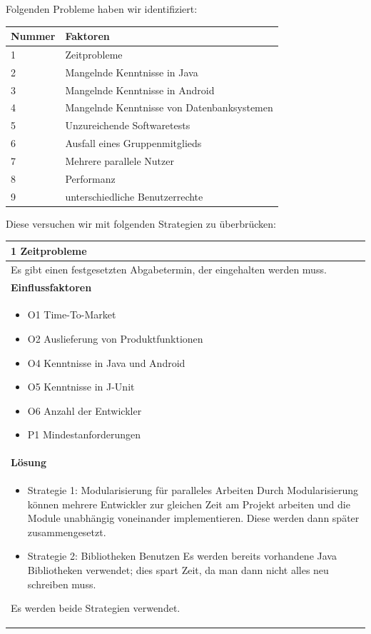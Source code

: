 \documentclass[fontsize=12pt,paper=a4,twoside]{scrartcl}
\begin{document}
Folgenden Probleme haben wir identifiziert:\\

\begin{table}[H]
\centering
\begin{tabular}{|l|l|}\hline
\textbf{Nummer} & \textbf{Faktoren}\\ \hline \hline
1 & Zeitprobleme\\ \hline
2 & Mangelnde Kenntnisse in Java\\ \hline
3 & Mangelnde Kenntnisse in Android\\ \hline
4 & Mangelnde Kenntnisse von Datenbanksystemen\\ \hline
5 & Unzureichende Softwaretests\\ \hline
6 & Ausfall eines Gruppenmitglieds\\ \hline
7 & Mehrere parallele Nutzer\\ \hline
8 & Performanz\\ \hline
9 & unterschiedliche Benutzerrechte\\ \hline
\end{tabular}
\end{table}

Diese versuchen wir mit folgenden Strategien zu überbrücken:

\begin{table}[H]
\begin{tabular}{|p{\textwidth}|}\hline
1 Zeitprobleme\\ \hline
Es gibt einen festgesetzten Abgabetermin, der eingehalten werden muss.\\ \hline
\textbf{Einflussfaktoren}\\
\begin{itemize}
\item O1 Time-To-Market
\item O2 Auslieferung von Produktfunktionen
\item O4 Kenntnisse in Java  und Android
\item O5 Kenntnisse in J-Unit
\item O6 Anzahl der Entwickler
\item P1 Mindestanforderungen
\end{itemize}\\ \hline
\textbf{Lösung}\\
\begin{itemize}
\item Strategie 1: Modularisierung für paralleles Arbeiten \leavevmode\newline
Durch Modularisierung können mehrere Entwickler zur gleichen Zeit am Projekt arbeiten und die Module unabhängig voneinander implementieren. Diese werden dann später zusammengesetzt.
\item Strategie 2: Bibliotheken Benutzen \leavevmode\newline
Es werden bereits vorhandene Java Bibliotheken verwendet; dies spart Zeit, da man dann nicht alles neu schreiben muss.
\end{itemize}
Es werden beide Strategien verwendet.\\ \hline
\end{tabular}
\end{table}
\end{document}
